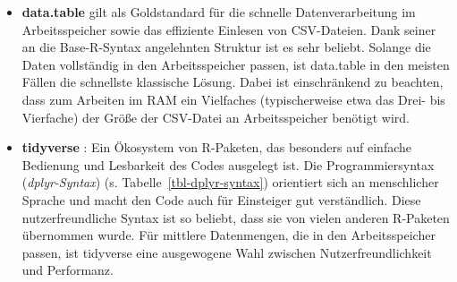 \documentclass[
  german,
  10pt,
  twoside]{article}
\providecommand{\tightlist}{%
  \setlength{\itemsep}{0pt}\setlength{\parskip}{0pt}}
\let\oldtextbf\textbf
\renewcommand{\textbf}[1]{{\color{wistaBlue}\oldtextbf{#1}}}
\let\oldref\ref
\renewcommand{\ref}[1]{\oldref{#1}\raisebox{-0.2ex}{\scriptsize\color{wistaBlue}\ding{247}}}
\begin{document}
\begin{itemize}
\tightlist
\item
  \textbf{data.table} \autocite{R-data.table} gilt als Goldstandard für
  die schnelle Datenverarbeitung im Arbeitsspeicher sowie das effiziente
  Einlesen von CSV-Dateien. Dank seiner an die Base-R-Syntax angelehnten
  Struktur ist es sehr beliebt. Solange die Daten vollständig in den
  Arbeitsspeicher passen, ist data.table in den meisten Fällen die
  schnellste klassische Lösung. Dabei ist einschränkend zu beachten,
  dass zum Arbeiten im RAM ein Vielfaches (typischerweise etwa das Drei-
  bis Vierfache) der Größe der CSV-Datei an Arbeitsspeicher benötigt
  wird.
\item
  \textbf{tidyverse} \autocite{R-tidyverse}: Ein Ökosystem von
  R-Paketen, das besonders auf einfache Bedienung und Lesbarkeit des
  Codes ausgelegt ist. Die Programmiersyntax (\emph{dplyr-Syntax}) (s.
  Tabelle~\ref{tbl-dplyr-syntax}) orientiert sich an menschlicher
  Sprache und macht den Code auch für Einsteiger gut verständlich. Diese
  nutzerfreundliche Syntax ist so beliebt, dass sie von vielen anderen
  R-Paketen übernommen wurde. Für mittlere Datenmengen, die in den
  Arbeitsspeicher passen, ist tidyverse eine ausgewogene Wahl zwischen
  Nutzerfreundlichkeit und Performanz.
\end{itemize}
\end{document}
